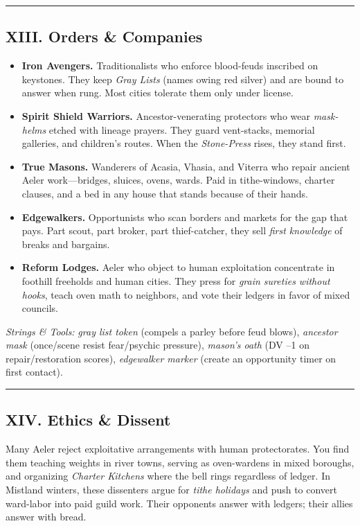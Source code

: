 \documentclass[11pt]{article}
\begin{document}
\medskip\hrule\medskip

\subsection{XIII. Orders \& Companies}

\begin{itemize}[leftmargin=*]
  \item \textbf{Iron Avengers.} Traditionalists who enforce blood-feuds inscribed on keystones. They keep \emph{Gray Lists} (names owing red silver) and are bound to answer when rung. Most cities tolerate them only under license.
  \item \textbf{Spirit Shield Warriors.} Ancestor-venerating protectors who wear \emph{mask-helms} etched with lineage prayers. They guard vent-stacks, memorial galleries, and children's routes. When the \emph{Stone-Press} rises, they stand first.
  \item \textbf{True Masons.} Wanderers of Acasia, Vhasia, and Viterra who repair ancient Aeler work---bridges, sluices, ovens, wards. Paid in tithe-windows, charter clauses, and a bed in any house that stands because of their hands.
  \item \textbf{Edgewalkers.} Opportunists who scan borders and markets for the gap that pays. Part scout, part broker, part thief-catcher, they sell \emph{first knowledge} of breaks and bargains.
  \item \textbf{Reform Lodges.} Aeler who object to human exploitation concentrate in foothill freeholds and human cities. They press for \emph{grain sureties without hooks}, teach oven math to neighbors, and vote their ledgers in favor of mixed councils.
\end{itemize}

\textit{Strings \& Tools:} \emph{gray list token} (compels a parley before feud blows), \emph{ancestor mask} (once/scene resist fear/psychic pressure), \emph{mason's oath} (DV --1 on repair/restoration scores), \emph{edgewalker marker} (create an opportunity timer on first contact).

\medskip\hrule\medskip

\subsection{XIV. Ethics \& Dissent}

Many Aeler reject exploitative arrangements with human protectorates. You find them teaching weights in river towns, serving as oven-wardens in mixed boroughs, and organizing \emph{Charter Kitchens} where the bell rings regardless of ledger. In Mistland winters, these dissenters argue for \emph{tithe holidays} and push to convert ward-labor into paid guild work. Their opponents answer with ledgers; their allies answer with bread.
\end{document}
